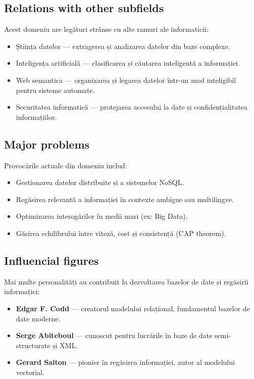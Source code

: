 \documentclass[12pt, letterpaper]{article}
\begin{document}
\subsection*{Relations with other subfields}
Acest domeniu are legături strânse cu alte ramuri ale informaticii:
\begin{itemize}
    \item Știința datelor — extragerea și analizarea datelor din baze complexe.
    \item Inteligența artificială — clasificarea și căutarea inteligentă a informației.
    \item Web semantica — organizarea și legarea datelor într-un mod inteligibil pentru sisteme automate.
    \item Securitatea informatică — protejarea accesului la date și confidențialitatea informațiilor.
\end{itemize}

\subsection*{Major problems}
Provocările actuale din domeniu includ:
\begin{itemize}
    \item Gestionarea datelor distribuite și a sistemelor NoSQL.
    \item Regăsirea relevantă a informației în contexte ambigue sau multilingve.
    \item Optimizarea interogărilor în medii mari (ex: Big Data).
    \item Găsirea echilibrului între viteză, cost și consistență (CAP theorem).
\end{itemize}

\subsection*{Influencial figures}
Mai multe personalități au contribuit la dezvoltarea bazelor de date și regăsirii informației:
\begin{itemize}
    \item \textbf{Edgar F. Codd} — creatorul modelului relațional, fundamentul bazelor de date moderne.
    \item \textbf{Serge Abiteboul} — cunoscut pentru lucrările în baze de date semi-structurate și XML.
    \item \textbf{Gerard Salton} — pionier în regăsirea informației, autor al modelului vectorial.
\end{itemize}
\end{document}
